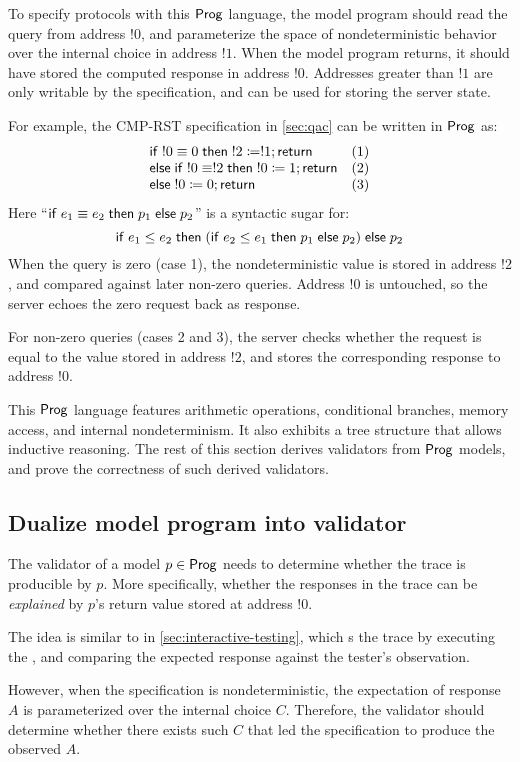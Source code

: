 To specify protocols with this $\mathsf{Prog}$ language, the model program should read
the query from address $!0$, and parameterize the space of nondeterministic
behavior over the internal choice in address $!1$.  When the model program
returns, it should have stored the computed response in address $!0$.  Addresses
greater than $!1$ are only writable by the specification, and can be used for
storing the server state.

For example, the CMP-RST specification in \autoref{sec:qac} can be written in
$\mathsf{Prog}$ as:
\[\begin{array}{ll}
\mathsf{if}\; !0\equiv0\;\mathsf{then}\; !2\coloneqq!1;\mathsf{return}&(1)\\
\mathsf{else}\;\mathsf{if}\; !0\equiv!2\;\mathsf{then}\;!0\coloneqq1;\mathsf{return}&(2)\\
\mathsf{else}\;!0\coloneqq0;\mathsf{return}&(3)
\end{array}\]
Here ``$\mathsf{if}\; e_1\equiv e_2\;\mathsf{then}\; p_1\;\mathsf{else}\; p_2$'' is a syntactic sugar for:
\[\mathsf{if}\; e_1\le e_2\;\mathsf{then}\;(\mathsf{if}\; e_2\le e_1\;\mathsf{then}\; p_1\;\mathsf{else}\; p_2)\;\mathsf{else}\; p_2\]
When the query is zero (case 1), the nondeterministic value is stored in address
$!2$, and compared against later non-zero queries.  Address $!0$ is untouched,
so the server echoes the zero request back as response.

For non-zero queries (cases 2 and 3), the server checks whether the request is
equal to the value stored in address $!2$, and stores the corresponding response
to address $!0$.

This $\mathsf{Prog}$ language features arithmetic operations, conditional branches,
memory access, and internal nondeterminism.  It also exhibits a tree structure
that allows inductive reasoning.  The rest of this section derives validators
from $\mathsf{Prog}$ models, and prove the correctness of such derived validators.

\subsection{Dualize model program into validator}
The validator of a model $p\in\mathsf{Prog}$ needs to determine whether the trace is
producible by $p$.  More specifically, whether the responses in the trace can be
{\em explained} by $p$'s return value stored at address $!0$.

The idea is similar to  in \autoref{sec:interactive-testing}, which
s the trace by executing the , and comparing the
expected response against the tester's observation.

However, when the specification is nondeterministic, the expectation of response
$A$ is parameterized over the internal choice $C$.  Therefore, the validator
should determine whether there exists such $C$ that led the specification to
produce the observed $A$.

